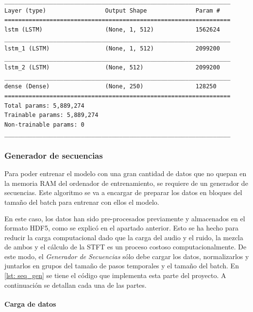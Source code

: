 \begin{lstlisting}[basicstyle=\tiny\ttfamily, caption={Resumen del modelo},captionpos=b, label={lst: model_resume},frame=tb,
xleftmargin=.2\textwidth, xrightmargin=.2\textwidth]
_________________________________________________________________
Layer (type)                 Output Shape              Param #   
=================================================================
lstm (LSTM)                  (None, 1, 512)            1562624   
_________________________________________________________________
lstm_1 (LSTM)                (None, 1, 512)            2099200   
_________________________________________________________________
lstm_2 (LSTM)                (None, 512)               2099200   
_________________________________________________________________
dense (Dense)                (None, 250)               128250    
=================================================================
Total params: 5,889,274
Trainable params: 5,889,274
Non-trainable params: 0
_________________________________________________________________
\end{lstlisting}

\subsubsection{Generador de secuencias}\label{sec: sequence_gen}
Para poder entrenar el modelo con una gran cantidad de datos que no quepan en la memoria \gls{RAM} del ordenador de entrenamiento, se requiere de un generador de secuencias. Este algoritmo se va a encargar de preparar los datos en bloques del tamaño del batch para entrenar con ellos el modelo.

En este caso, los datos han sido pre-procesados previamente y almacenados en el formato \gls{HDF5}, como se explicó en el apartado anterior. Esto se ha hecho para reducir la carga computacional dado que la carga del audio y el ruido, la mezcla de ambos y el cálculo de la \gls{STFT} es un proceso costoso computacionalmente. De este modo, el \textit{Generador de Secuencias} sólo debe cargar los datos, normalizarlos y juntarlos en grupos del tamaño de pasos temporales y el tamaño del batch. En \ref{lst: seq_gen} se tiene el código que implementa esta parte del proyecto. A continuación se detallan cada una de las partes.

\paragraph{Carga de datos}

